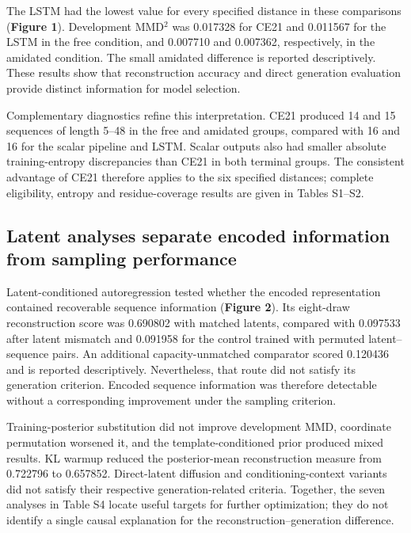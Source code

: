 \documentclass[unnumsec,webpdf,contemporary,large]{oup-authoring-template}
\begin{document}
The LSTM had the lowest value for every specified distance in these comparisons (\textbf{Figure 1}). Development MMD$^2$ was 0.017328 for CE21 and 0.011567 for the LSTM in the free condition, and 0.007710 and 0.007362, respectively, in the amidated condition. The small amidated difference is reported descriptively. These results show that reconstruction accuracy and direct generation evaluation provide distinct information for model selection.



Complementary diagnostics refine this interpretation. CE21 produced 14 and 15 sequences of length 5--48 in the free and amidated groups, compared with 16 and 16 for the scalar pipeline and LSTM. Scalar outputs also had smaller absolute training-entropy discrepancies than CE21 in both terminal groups. The consistent advantage of CE21 therefore applies to the six specified distances; complete eligibility, entropy and residue-coverage results are given in Tables S1--S2.

\subsection{Latent analyses separate encoded information from sampling performance}

Latent-conditioned autoregression tested whether the encoded representation contained recoverable sequence information (\textbf{Figure 2}). Its eight-draw reconstruction score was 0.690802 with matched latents, compared with 0.097533 after latent mismatch and 0.091958 for the control trained with permuted latent--sequence pairs. An additional capacity-unmatched comparator scored 0.120436 and is reported descriptively. Nevertheless, that route did not satisfy its generation criterion. Encoded sequence information was therefore detectable without a corresponding improvement under the sampling criterion.

Training-posterior substitution did not improve development MMD, coordinate permutation worsened it, and the template-conditioned prior produced mixed results. KL warmup reduced the posterior-mean reconstruction measure from 0.722796 to 0.657852. Direct-latent diffusion and conditioning-context variants did not satisfy their respective generation-related criteria. Together, the seven analyses in Table S4 locate useful targets for further optimization; they do not identify a single causal explanation for the reconstruction--generation difference.
\end{document}
